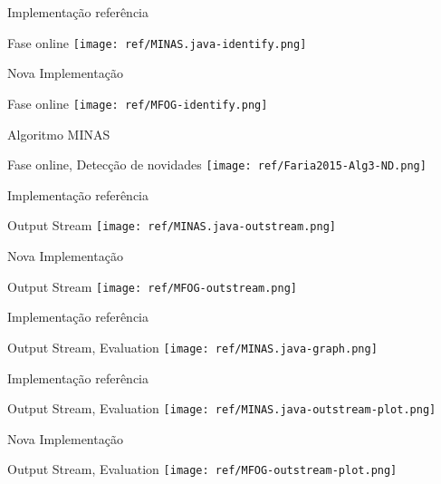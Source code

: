 \documentclass[aspectratio=43,10pt]{beamer}
\begin{document}
\begin{frame}[fragile]{Implementação referência}
  \begin{alertblock}{Fase online}
    \texttt{[image: ref/MINAS.java-identify.png]}
  \end{alertblock}
\end{frame}

\begin{frame}[fragile]{Nova Implementação}
  \begin{alertblock}{Fase online}
    \texttt{[image: ref/MFOG-identify.png]}
  \end{alertblock}
\end{frame}

\begin{frame}[fragile]{Algoritmo MINAS}
  \begin{alertblock}{Fase online, Detecção de novidades}
    \texttt{[image: ref/Faria2015-Alg3-ND.png]}
  \end{alertblock}
\end{frame}

\begin{frame}[fragile]{Implementação referência}
  \begin{alertblock}{Output Stream}
    \texttt{[image: ref/MINAS.java-outstream.png]}
  \end{alertblock}
\end{frame}

\begin{frame}[fragile]{Nova Implementação}
  \begin{alertblock}{Output Stream}
    \texttt{[image: ref/MFOG-outstream.png]}
  \end{alertblock}
\end{frame}

\begin{frame}[fragile]{Implementação referência}
  \begin{alertblock}{Output Stream, Evaluation}
    \texttt{[image: ref/MINAS.java-graph.png]}
  \end{alertblock}
\end{frame}
\begin{frame}[fragile]{Implementação referência}
  \begin{alertblock}{Output Stream, Evaluation}
    \texttt{[image: ref/MINAS.java-outstream-plot.png]}
  \end{alertblock}
\end{frame}

\begin{frame}[fragile]{Nova Implementação}
  \begin{alertblock}{Output Stream, Evaluation}
    \texttt{[image: ref/MFOG-outstream-plot.png]}
  \end{alertblock}
\end{frame}
\end{document}
